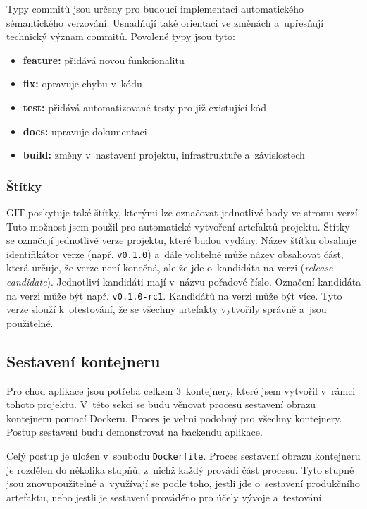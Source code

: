 \documentclass[
  tables=false,
  glossaries,
  index
]{kidiplom}
\begin{document}
Typy commitů jsou určeny pro budoucí implementaci automatického sémantického verzování. Usnadňují také orientaci ve změnách a~upřesňují technický význam commitů. Povolené typy jsou tyto:
\begin{itemize}
	\item \textbf{feature:} přidává novou funkcionalitu
	\item \textbf{fix:} opravuje chybu v~kódu
	\item \textbf{test:} přidává automatizované testy pro již existující kód
	\item \textbf{docs:} upravuje dokumentaci
	\item \textbf{build:} změny v~nastavení projektu, infrastruktuře a~závislostech
\end{itemize}

\subsubsection{Štítky}
GIT poskytuje také štítky, kterými lze označovat jednotlivé body ve stromu verzí. Tuto možnost jsem použil pro automatické vytvoření artefaktů projektu. Štítky se označují jednotlivé verze projektu, které budou vydány. Název štítku obsahuje identifikátor verze (např. \texttt{v0.1.0}) a~dále volitelně může název obsahovat část, která určuje, že verze není konečná, ale že jde o~kandidáta na verzi (\emph{release candidate}). Jednotliví kandidáti mají v~názvu pořadové číslo. Označení kandidáta na verzi může být např. \texttt{v0.1.0-rc1}. Kandidátů na verzi může být více. Tyto verze slouží k~otestování, že se všechny artefakty vytvořily správně a~jsou použitelné.

\subsection{Sestavení kontejneru}
Pro chod aplikace jsou potřeba celkem 3~kontejnery, které jsem vytvořil v~rámci tohoto projektu. V~této sekci se budu věnovat procesu sestavení obrazu kontejneru pomocí Dockeru. Proces je velmi podobný pro všechny kontejnery. Postup sestavení budu demonstrovat na backendu aplikace.

Celý postup je uložen v~soubodu \texttt{Dockerfile}. Proces sestavení obrazu kontejneru je rozdělen do několika stupňů, z~nichž každý provádí část procesu. Tyto stupně jsou znovupoužitelné a~využívají se podle toho, jestli jde o~sestavení produkčního artefaktu, nebo jestli je sestavení prováděno pro účely vývoje a~testování.
\end{document}
